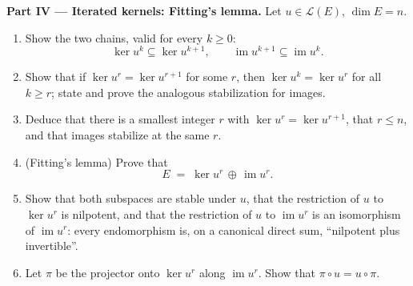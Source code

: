 \begin{problem}
\medskip
\noindent\textbf{Part IV --- Iterated kernels: Fitting's lemma.}
Let $u \in \mathcal{L}(E)$, $\dim E = n$.
\begin{enumerate}[resume]
  \item Show the two chains, valid for every $k \geq 0$:
        \[
        \ker u^k \subseteq \ker u^{k+1},
        \qquad
        \operatorname{im} u^{k+1} \subseteq \operatorname{im}
        u^k .
        \]
  \item Show that if $\ker u^{r} = \ker u^{r+1}$ for some $r$,
        then $\ker u^{k} = \ker u^{r}$ for all $k \geq r$; state
        and prove the analogous stabilization for images.
  \item Deduce that there is a smallest integer $r$ with $\ker
        u^{r} = \ker u^{r+1}$, that $r \leq n$, and that images
        stabilize at the same $r$.
  \item (Fitting's lemma) Prove that
        \[
        E \;=\; \ker u^{r} \,\oplus\, \operatorname{im} u^{r} .
        \]
  \item Show that both subspaces are stable under $u$, that the
        restriction of $u$ to $\ker u^{r}$ is nilpotent, and that
        the restriction of $u$ to $\operatorname{im} u^{r}$ is an
        isomorphism of $\operatorname{im} u^{r}$: every
        endomorphism is, on a canonical direct sum, ``nilpotent
        plus invertible''.
  \item Let $\pi$ be the projector onto $\ker u^{r}$ along
        $\operatorname{im} u^{r}$. Show that $\pi \circ u = u
        \circ \pi$.
\end{enumerate}


\end{problem}
